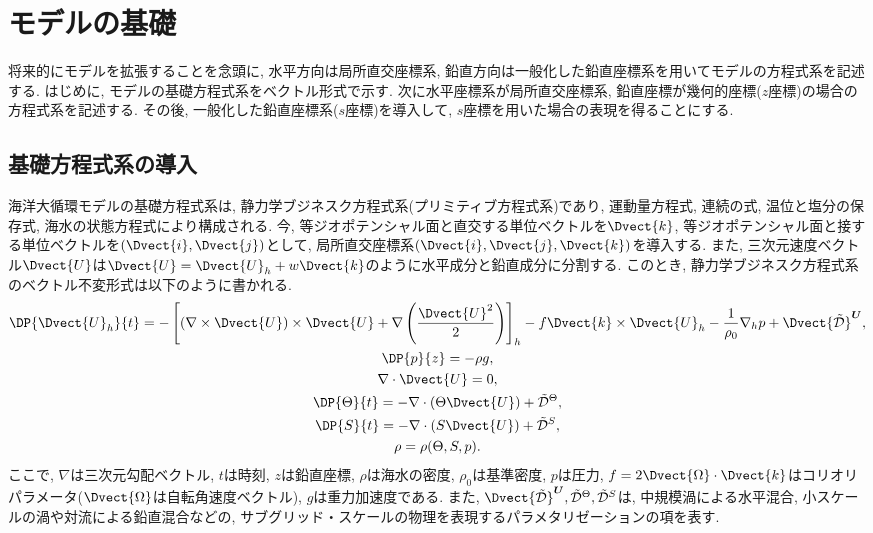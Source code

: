 \section{モデルの基礎}
将来的にモデルを拡張することを念頭に, 水平方向は局所直交座標系, 
鉛直方向は一般化した鉛直座標系を用いてモデルの方程式系を記述する. 
はじめに, モデルの基礎方程式系をベクトル形式で示す. 
次に水平座標系が局所直交座標系, 鉛直座標が幾何的座標($z$座標)の場合の方程式系を記述する.  
その後, 一般化した鉛直座標系($s$座標)を導入して, $s$座標を用いた場合の表現を得ることにする. 

\subsection{基礎方程式系の導入}
海洋大循環モデルの基礎方程式系は, 静力学ブジネスク方程式系(プリミティブ方程式系)であり, 
運動量方程式, 連続の式, 温位と塩分の保存式, 海水の状態方程式により構成される. 
今, 等ジオポテンシャル面と直交する単位ベクトルを$\Dvect{k}$, 
等ジオポテンシャル面と接する単位ベクトルを$(\Dvect{i},\Dvect{j})$として, 
局所直交座標系$(\Dvect{i}, \Dvect{j}, \Dvect{k})$を導入する. 
また, 三次元速度ベクトル$\Dvect{U}$は$\Dvect{U}=\Dvect{U}_h + w \Dvect{k}$のように水平成分と鉛直成分に分割する. 
このとき, 静力学ブジネスク方程式系のベクトル不変形式は以下のように書かれる. 
\begin{subequations} 
\label{eq:OCN_primitive_eq_vector_form}
\begin{gather}
 \DP{\Dvect{U}_h}{t} = 
   - \left[ (\nabla \times \Dvect{U}) \times \Dvect{U} + \nabla \left(\dfrac{\Dvect{U}^2}{2}\right) \right]_h  
   - f \Dvect{k} \times \Dvect{U}_h 
   - \dfrac{1}{\rho_0} \nabla_h p  + \Dvect{\mathcal{\tilde{D}}}^{\bm{U}} , 
\label{eq:horizontal_mom_eq} \\
 \DP{p}{z} = - \rho g, 
 \label{eq:hydrostatic_eq} \\
 \nabla \cdot \Dvect{U} = 0, 
 \label{eq:continuous_eq} \\
 \DP{\Theta}{t} = - \nabla\cdot(\Theta\Dvect{U}) + \mathcal{\tilde{D}}^\Theta , \\
 \DP{S}{t} = - \nabla\cdot(S\Dvect{U}) + \mathcal{\tilde{D}}^S, \\
 \rho = \rho(\Theta, S, p). 
\end{gather}  
\end{subequations}
ここで, $\nabla$は三次元勾配ベクトル, $t$は時刻, $z$は鉛直座標, $\rho$は海水の密度, 
$\rho_0$は基準密度, $p$は圧力, 
$f=2\Dvect{\Omega}\cdot\Dvect{k}$はコリオリパラメータ($\Dvect{\Omega}$は自転角速度ベクトル), 
$g$は重力加速度である. 
また, $\Dvect{\mathcal{\tilde{D}}}^{\bm{U}}, \mathcal{\tilde{D}}^\Theta, \mathcal{\tilde{D}}^S$は, 
中規模渦による水平混合, 小スケールの渦や対流による鉛直混合などの, 
サブグリッド・スケールの物理を表現するパラメタリゼーションの項を表す. 

